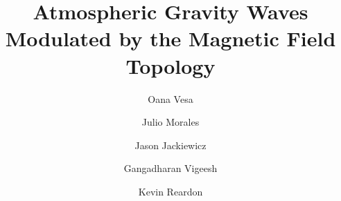 \documentclass[preprint2,linenumbers]{aastex701}
\begin{document}
\title{Atmospheric Gravity Waves Modulated by the Magnetic Field Topology}


\author[orcid=0000-0001-6754-1520,gname=Oana,sname=Vesa]{Oana Vesa}

\author[orcid=0000-0001-7525-7423,gname=Julio,sname=Morales]{Julio Morales}

\author[orcid=0000-0001-9659-7486, gname=Jason,sname=Jackiewicz]{Jason Jackiewicz}

\author[orcid=0000-0002-9820-9114, gname=Gangadharan,sname=Vigeesh]{Gangadharan Vigeesh}

\author[orcid=0000-0001-8016-0001, gname=Kevin,sname=Reardon]{Kevin Reardon}

 
\end{document}
